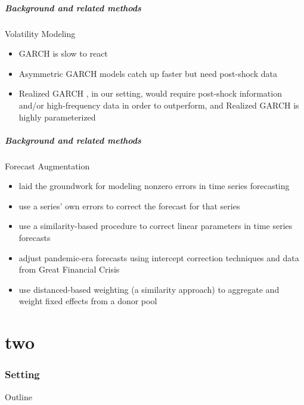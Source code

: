 \documentclass{beamer}
\theoremstyle{definition}
\begin{document}
\begin{frame}
    \frametitle{Background and related methods}
    Volatility Modeling

    \begin{itemize}
        \item GARCH is slow to react \parencite[][]{andersen2003modeling}
        \item Asymmetric GARCH models catch up faster but need post-shock data
        \item Realized GARCH \parencite[][]{hansen2012realized}, in our setting, would require post-shock information and/or high-frequency data in order to outperform, and Realized GARCH is highly parameterized
    \end{itemize}
\end{frame}

\begin{frame}
    \frametitle{Background and related methods}

    Forecast Augmentation
    \begin{itemize}
        \item \cite[][]{clements1996intercept,clements1998forecasting} laid the groundwork for modeling nonzero errors in time series forecasting
        \item \cite[][]{guerron2017macroeconomic} use a series' own errors to correct the forecast for that series
        \item \cite[][]{dendramis2020similarity} use a similarity-based procedure to correct linear parameters in time series forecasts
        \item \cite[][]{foroni2022forecasting} adjust pandemic-era forecasts using intercept correction techniques and data from Great Financial Crisis
        \item \cite[][]{lin2021minimizing} use distanced-based weighting (a similarity approach) to aggregate and weight fixed effects from a donor pool
    \end{itemize}
\end{frame}

\part{two}
\section{Setting}
\begin{frame}{Outline} %
    \tableofcontents[part=1,currentsection]\tableofcontents
\end{frame}
\end{document}
